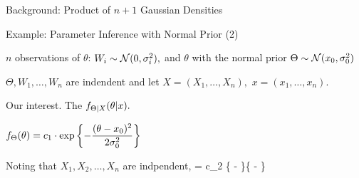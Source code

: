 \begin{frame}{Background: Product of $n+1$ Gaussian Densities}


\end{frame}

\begin{frame}{Example: Parameter Inference with Normal Prior (2)}

    \plitemsep 0.03in
    \bci
    
  \item $n$ observations of $\theta$: $W_i \sim
    \mathcal N(0,\sigma_i^2),$ and $\theta$ with the normal prior $\Theta \sim \mathcal N(x_0,\sigma_0^2)$

  \item $\Theta, W_1, \ldots, W_n$ are indendent and
    let  $X = (X_1, \ldots, X_n),$ $x=(x_1, \ldots, x_n).$      

  \item Our interest. The  $f_{\Theta|X}(\theta|x).$ 


    \medskip
  \item<2->  $\displaystyle f_\Theta(\theta) = c_1\cdot \exp\left\{ -
        \frac{(\theta - x_0)^2}{2 \sigma_0^2}  \right\}$
\item<3->  Noting that $X_1, X_2, \ldots, X_n$
  are indpendent, 
  \aleq
  {
    \fxcth = c_2 \cdot \exp \left\{ -
         \right\}\cdots \exp \left\{ -
        \right\}
    }
\eci



\end{frame}

